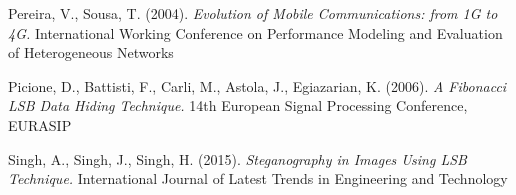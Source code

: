 \documentclass[11pt, english]{article}
\begin{document}
\begin{thebibliography}{9}

		Pereira, V., Sousa, T. (2004).
                \textsl{Evolution of Mobile Communications: from 1G to 4G.}
		International Working Conference on Performance Modeling and Evaluation of Heterogeneous Networks

		Picione, D., Battisti, F., Carli, M., Astola, J., Egiazarian, K. (2006).
		\textsl{A Fibonacci LSB Data Hiding Technique.}
		14th European Signal Processing Conference, EURASIP

		Singh, A., Singh, J., Singh, H. (2015).
                \textsl{Steganography in Images Using LSB Technique.}
		International Journal of Latest Trends in Engineering and Technology

\end{thebibliography}
\end{document}
